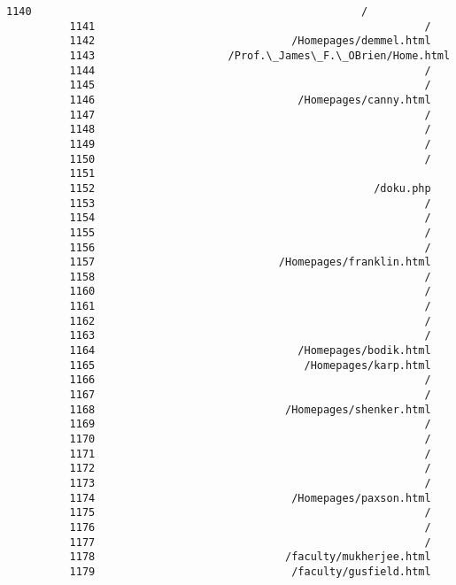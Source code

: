 \documentclass[11pt]{article}
\begin{document}
\begin{Verbatim}[commandchars=\\\{\}]
          1140                                                    /
          1141                                                    /
          1142                               /Homepages/demmel.html
          1143                     /Prof.\_James\_F.\_OBrien/Home.html
          1144                                                    /
          1145                                                    /
          1146                                /Homepages/canny.html
          1147                                                    /
          1148                                                    /
          1149                                                    /
          1150                                                    /
          1151                                                     
          1152                                            /doku.php
          1153                                                    /
          1154                                                    /
          1155                                                    /
          1156                                                    /
          1157                             /Homepages/franklin.html
          1158                                                    /
          1160                                                    /
          1161                                                    /
          1162                                                    /
          1163                                                    /
          1164                                /Homepages/bodik.html
          1165                                 /Homepages/karp.html
          1166                                                    /
          1167                                                    /
          1168                              /Homepages/shenker.html
          1169                                                    /
          1170                                                    /
          1171                                                    /
          1172                                                    /
          1173                                                    /
          1174                               /Homepages/paxson.html
          1175                                                    /
          1176                                                    /
          1177                                                    /
          1178                              /faculty/mukherjee.html
          1179                               /faculty/gusfield.html

\end{Verbatim}
\end{document}
